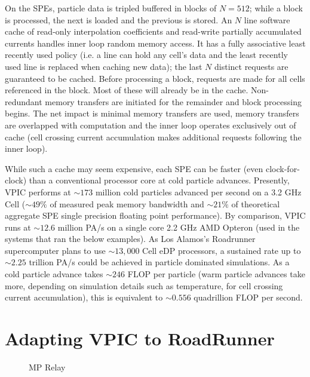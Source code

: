 \documentclass[letter,10pt]{article}
\begin{document}
On the SPEs, particle data is tripled buffered in blocks of $N=512$;
while a block is processed, the next is loaded and the previous is
stored.  An $N$ line software cache of read-only interpolation
coefficients and read-write partially accumulated currents handles
inner loop random memory access.  It has a fully associative least
recently used policy (i.e. a line can hold any cell's data and the
least recently used line is replaced when caching new data); the last
$N$ distinct requests are guaranteed to be cached.  Before processing
a block, requests are made for all cells referenced in the block.
Most of these will already be in the cache.  Non-redundant memory
transfers are initiated for the remainder and block processing begins.
The net impact is minimal memory transfers are used, memory transfers
are overlapped with computation and the inner loop operates
exclusively out of cache (cell crossing current accumulation makes
additional requests following the inner loop).

While such a cache may seem expensive, each SPE can be faster (even
clock-for-clock) than a conventional processor core at cold particle
advances.  Presently, VPIC performs at $\sim 173$ million cold
particles advanced per second on a 3.2 GHz Cell ($\sim 49\%$ of
measured peak memory bandwidth and $\sim 21\%$ of theoretical
aggregate SPE single precision floating point performance).  By
comparison, VPIC runs at $\sim 12.6$ million PA/s on a single core 2.2
GHz AMD Opteron (used in the systems that ran the below examples).  As
Los Alamos's Roadrunner supercomputer plans to use $\sim 13,000$ Cell
eDP processors, a sustained rate up to $\sim 2.25$ trillion PA/s could
be achieved in particle dominated simulations.  As a cold particle
advance takes $\sim 246$ FLOP per particle (warm particle advances
take more, depending on simulation details such as temperature, for
cell crossing current accumulation), this is equivalent to $\sim
0.556$ quadrillion FLOP per second.






\section*{Adapting VPIC to RoadRunner}

\begin{figure}
    \begin{center}
    \scalebox{0.4}{}
    \caption{MP Relay}
    \label{fig:relay}
    \end{center}
\end{figure}
\end{document}
